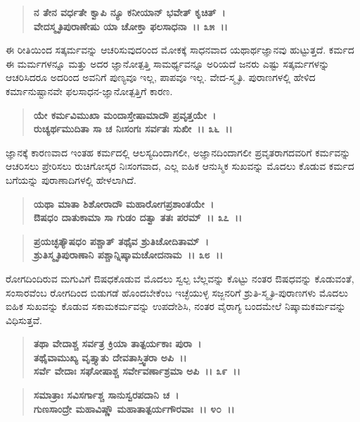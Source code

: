 \begin{verse}
\textbf{ನ ತೇನ ವರ್ಧತೇ ಕ್ವಾಪಿ ನ್ಯೂ ಕನೀಯಾನ್ ಭವೇತ್ ಕೃಚಿತ್~।}\\\textbf{ವೇದಸ್ಮೃತಿಪುರಾಣೇಷು ಯಾ ಚೋಕ್ತಾ ಫಲಸಾಧನಾ~।। ೩೫~।।}
\end{verse}

ಈ ರೀತಿಯಿಂದ ಸತ್ಕರ್ಮವನ್ನು ಆಚರಿಸುವುದರಿಂದ ಮೋಕಕ್ಕೆ ಸಾಧನವಾದ ಯಥಾರ್ಥ\-ಜ್ಞಾನವು ಹುಟ್ಟುತ್ತದೆ. ಕರ್ಮದ ಈ ಮರ್ಮಗಳನ್ನೂ ಮತ್ತು ಅದರ ಜ್ಞಾನೋತ್ಪತ್ತಿ ಸಾಮರ್ಥ್ಯವನ್ನೂ ಅರಿಯದೆ ಜನರು ಎಷ್ಟು ಸತ್ಕರ್ಮಗಳನ್ನು ಆಚರಿಸಿದರೂ ಅದರಿಂದ ಅವನಿಗೆ ಪುಣ್ಯವೂ ಇಲ್ಲ, ಪಾಪವೂ ಇಲ್ಲ. ವೇದ-ಸ್ಮೃತಿ. ಪುರಾಣಗಳಲ್ಲಿ ಹೇಳಿದ ಕರ್ಮಾನುಷ್ಟಾನವೇ ಫಲ\-ಸಾಧನ-ಜ್ಞಾನೋತ್ಪತ್ತಿಗೆ ಕಾರಣ.

\begin{verse}
\textbf{ಯೇ ಕರ್ಮವಿಮುಖಾ ಮಂದಾಸ್ತೇಷಾಮಾದೌ ಪ್ರವೃತ್ತಯೇ~।}\\\textbf{ರುಚ್ಯರ್ಥಮುದಿತಾ ಸಾ ಚ ನಿಃಸಂಗಃ ಸರ್ವತಃ ಸುಖೀ~।। ೩೬~।।}
\end{verse}

ಜ್ಞಾನಕ್ಕೆ ಕಾರಣವಾದ ಇಂತಹ ಕರ್ಮದಲ್ಲಿ ಆಲಸ್ಯದಿಂದಾಗಲೀ, ಅಜ್ಞಾನದಿಂದಾಗಲೀ ಪ್ರವೃತರಾಗದವರಿಗೆ ಕರ್ಮವನ್ನು ಆಚರಿಸಲು ಪ್ರೇರಿಸಲು ರುಚಿಗೋಸ್ಕರ ನಿಃಸಂಗವಾದ, ಎಲ್ಲ ಐಹಿಕ ಆನುಸ್ಮಿಕ ಸುಖವನ್ನು ಮೊದಲು ಕೊಡುವ ಕರ್ಮದ ಬಗೆಯನ್ನು ಪುರಾಣಾದಿಗಳಲ್ಲಿ ಹೇಳಲಾಗಿದೆ.

\begin{verse}
\textbf{ಯಥಾ ಮಾತಾ ಶಿಶೋರಾದೌ ಮಹಾರೋಗಪ್ರಶಾಂತಯೇ~।}\\\textbf{ಔಷಧಂ ದಾತುಕಾಮಾ ಸಾ ಗುಡಂ ದತ್ವಾ ತತಃ ಪರಮ್~।। ೩೭~।। } 
\end{verse}

\begin{verse}
\textbf{ಪ್ರಯಚ್ಛತ್ಯೌಷಧಂ ಪಶ್ಚಾತ್ ತಥೈವ ಶ್ರುತಿಚೋದಿತಾಮ್~।}\\\textbf{ಶ್ರುತಿಸ್ಮೃತಿಪುರಾಣಾನಿ ಪಶ್ಚಾನ್ನಿಷ್ಕಾಮಚೋದನಾಮ~।। ೩೮~।।}
\end{verse}

ರೋಗದಿಂದಿರುವ ಮಗುವಿಗೆ ಔಷಧಕೊಡುವ ಮೊದಲು ಸ್ವಲ್ಪ ಬೆಲ್ಲವನ್ನು ಕೊಟ್ಟು ನಂತರ ಔಷಧವನ್ನು ಕೊಡುವಂತೆ, ಸಂಸಾರವೆಂಬ ರೋಗದಿಂದ ಬಿಡುಗಡೆ ಹೊಂದಬೇಕೆಂಬ ಇಚ್ಛೆಯುಳ್ಳ ಸಜ್ಜನರಿಗೆ ಶ್ರುತಿ-ಸ್ಮೃತಿ-ಪುರಾಣಗಳು ಮೊದಲು ಐಹಿಕ ಸುಖವನ್ನು ಕೊಡುವ ಸಕಾಮಕರ್ಮವನ್ನು ಉಪದೇಶಿಸಿ, ನಂತರ ವೈರಾಗ್ಯ ಬಂದಮೇಲೆ ನಿಷ್ಕಾಮಕರ್ಮವನ್ನು ವಿಧಿಸುತ್ತವೆ.

\begin{verse}
\textbf{ತಥಾ ವೇದಾಶ್ಚ ಸರ್ವತ್ರ ಕ್ರಿಯಾ ತಾತ್ಪರ್ಯಕಾಃ ಪುರಾ~।}\\\textbf{ತಥೈವಾಮುಖ್ಯ ವೃತ್ತ್ಯಾತು ದೇವತಾಸ್ತ್ವಿತರಾ ಅಪಿ~।। }\\\textbf{ಸರ್ವೆ ವೇದಾಃ ಸಘೋಷಾಶ್ಚ ಸರ್ವೇವರ್ಣಾಶ್ರಮಾ ಅಪಿ~।। ೩೯~।। }
\end{verse}

\begin{verse}
\textbf{ಸಮಾತ್ರಾಃ ಸವಿಸರ್ಗಾಶ್ಚ ಸಾನುಸ್ವರಪದಾನಿ ಚ~।}\\\textbf{ಗುಣಸಾಂದ್ರೇ ಮಹಾವಿಷ್ಣೌ ಮಹಾತಾತ್ಪರ್ಯಗೌರವಾಃ~।। ೪೦~।।} 
\end{verse}

